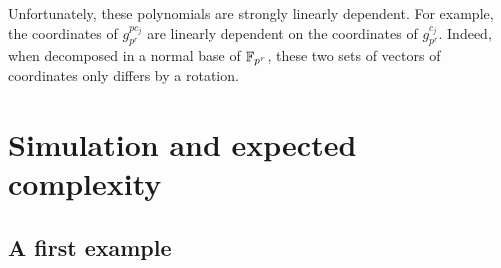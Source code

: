 \documentclass[12pt,a4paper,titlepage]{article}
\begin{document}
Unfortunately, these polynomials are strongly linearly dependent.
For example, the coordinates of $g_{p^r}^{p c_j}$ are linearly dependent on the coordinates of $g_{p^r}^{c_j}$. Indeed, when decomposed in a normal base of $\mathbb{F}_{p^r}$, these two sets of vectors of coordinates only differs by a rotation.





\section{Simulation and expected complexity}
\label{sec:Simul}

\subsection{A first example}
\end{document}
